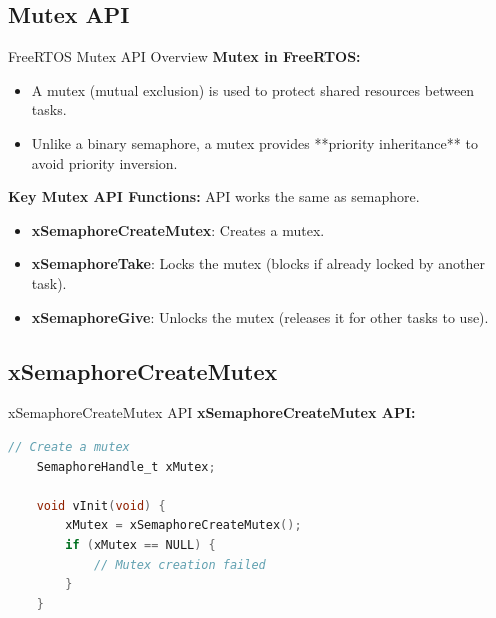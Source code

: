 \documentclass[10pt]{beamer}
\begin{document}
\subsection{Mutex API}

\begin{frame}{FreeRTOS Mutex API Overview}
    \textbf{Mutex in FreeRTOS:}
    \begin{itemize}
        \item A mutex (mutual exclusion) is used to protect shared resources between tasks.
        \item Unlike a binary semaphore, a mutex provides **priority inheritance** to avoid priority inversion.
    \end{itemize}
    
    \vspace{0.3cm}
    
    \textbf{Key Mutex API Functions:}
    API works the same as semaphore.
    \begin{itemize}
        \item \textbf{xSemaphoreCreateMutex}: Creates a mutex.
        \item \textbf{xSemaphoreTake}: Locks the mutex (blocks if already locked by another task).
        \item \textbf{xSemaphoreGive}: Unlocks the mutex (releases it for other tasks to use).
    \end{itemize}
    
\end{frame}

\subsection{xSemaphoreCreateMutex}

\begin{frame}[fragile]{xSemaphoreCreateMutex API}
    \textbf{xSemaphoreCreateMutex API:}
    \begin{lstlisting}[language=C]
    // Create a mutex
    SemaphoreHandle_t xMutex;
    
    void vInit(void) {
        xMutex = xSemaphoreCreateMutex();
        if (xMutex == NULL) {
            // Mutex creation failed
        }
    }
    \end{lstlisting}
\end{frame}
    
\end{document}
